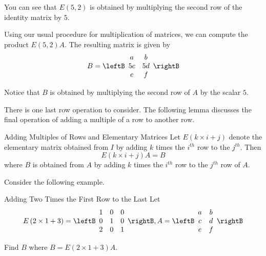 \begin{solution}
You can see that $E \left(5, 2\right)$ is obtained by multiplying the second row 
of the identity matrix by $5$.

Using our usual procedure for multiplication of matrices, we can compute the product $E \left(5, 2\right)A$. The 
resulting matrix is given by 
\begin{equation*}
B
=\leftB
\begin{array}{cc}
a & b \\
5c & 5d \\
e & f
\end{array}
\rightB
\end{equation*}

Notice that $B$ is obtained by multiplying the second row of $A$ by the scalar $5$. 
\end{solution}

There is one last row operation to consider. The following lemma discusses the final
operation of adding a multiple of a row to another row.

\begin{lemma}{Adding Multiples of Rows and Elementary Matrices}\label{lem:addingrowselemmatrix}
Let $E\left( k \times i+j\right) $ denote the elementary
matrix obtained from $I$ by adding $k$ times the $i^{th}$ row to the $j^{th}$. Then
\begin{equation*}
E\left( k \times i+j\right) A=B
\end{equation*}
where $B$ is obtained from $A$ by adding $k$ times the $i^{th}$ row to the $j^{th}$ row of $A.$
\end{lemma}

Consider the following example.

\begin{example}{Adding Two Times the First Row to the Last}\label{exa:twotimesrowelemmatrix}
Let
\begin{equation*}
E\left( 2 \times 1+3\right) = \leftB
\begin{array}{rrr}
1 & 0 & 0 \\
0 & 1 & 0 \\
2 & 0 & 1
\end{array}
\rightB, A =  \leftB
\begin{array}{cc}
a & b \\
c & d \\
e & f
\end{array}
\rightB 
\end{equation*}

Find $B$ where $B = E\left( 2 \times 1+3\right)A$.
\end{example}

